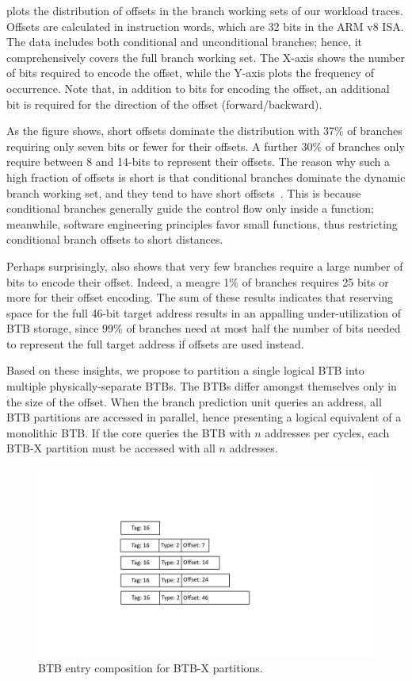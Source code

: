  plots the distribution of offsets in the branch working sets of our workload traces. Offsets are calculated in instruction words, which are 32 bits in the ARM v8 ISA. The data includes both conditional and unconditional branches; hence, it comprehensively covers the full branch working set. The X-axis shows the number of bits required to encode the offset, while the Y-axis plots the frequency of occurrence. Note that, in addition to bits for encoding the offset, an additional bit is required for the direction of the offset (forward/backward). 

As the figure shows, short offsets dominate the distribution with 37\% of branches requiring only seven bits or fewer for their offsets. A further 30\% of branches only require between 8 and 14-bits to represent their offsets. The reason why such a high fraction of offsets is short is that conditional branches dominate the dynamic branch working set, and they tend to have short offsets~\cite{boomerang}. This is because conditional branches generally guide the control flow only inside a function; meanwhile, software engineering principles favor small functions, thus restricting conditional branch offsets to short distances.

Perhaps surprisingly,  also shows that very few branches require a large number of bits to encode their offset. Indeed, a meagre 1\% of branches requires 25 bits or more for their offset encoding. The sum of these results indicates that reserving space for the full 46-bit target address results in an appalling under-utilization of BTB storage, since 99\% of branches need at most half the number of bits needed to represent the full target address if offsets are used instead.  

Based on these insights, we propose to partition a single logical BTB into multiple physically-separate BTBs. The BTBs differ amongst themselves only in the size of the offset. When the branch prediction unit queries an address, all BTB partitions are accessed in parallel, hence presenting a logical equivalent of a monolithic BTB. If the core queries the BTB with $n$ addresses per cycles, each BTB-X partition must be accessed with all $n$ addresses.

\begin{figure}
    \centering
    \includegraphics[width=0.7\columnwidth, trim=230 150 340 150, clip]{figures/x-btb.pdf}
    \caption{BTB entry composition for BTB-X partitions.} 
    \label{fig:btb-dist}
    \vspace{-0.1in}
\end{figure}

